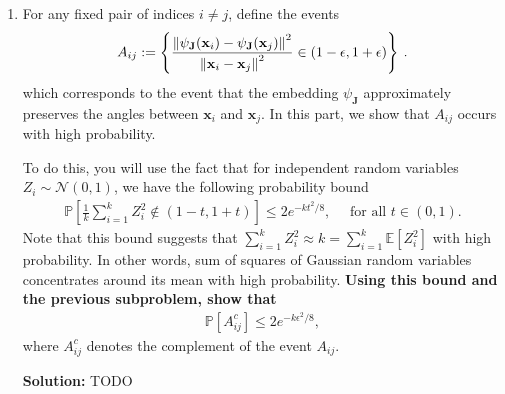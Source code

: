 \documentclass{article}
\DeclareMathOperator{\R}{\mathbb{R}}
\newcommand{\mat}[1]{\mathbf{#1}}
\renewcommand{\vec}[1]{\boldsymbol{\mathbf{#1}}}
\newenvironment{solution}{\color{blue} \smallskip \textbf{Solution:}}{}
\begin{document}
\begin{enumerate}
Consider the random matrix $ \mat J \in \R^{k \times d}$ with each of its entries being i.i.d. $\mathcal{N}(0, 1)$
and consider the map $\psi_{\mat J}: \R^\dims \mapsto \R^k$ such that $\psi_{\mat J}(\vec{x})= \frac{1}{\sqrt{k}}\mat J \vec x$.
{\bf Show that for any \emph{fixed non-zero vector $\vec u$}, 
the random variable $\displaystyle\frac{\Vert \psi_{\mat J}(\vec u)\Vert^2}{\Vert \vec u\Vert^2}$ 
can be written as 
\begin{align*}
	\frac{1}{k}\sum_{i=1}^k Z_i^2
\end{align*}
where $Z_i$'s are i.i.d. $\mathcal{N}(0, 1)$ random variables.}

\begin{solution}
    TODO
\end{solution}

\newpage
\item For any fixed pair of indices $i \ne j$, define the events
\[A_{ij} := \left\{\displaystyle\frac{\norm{\psi_{\mat J}(\vec x_i) - \psi_{\mat J}(\vec x_j)}^2}{\norm{\vec x_i - \vec x_j}^2} \in (1-\epsilon, 1+\epsilon) \right\}\:.\]
which corresponds to the event that the embedding $\psi_{\mat J}$ approximately preserves the angles between $\vec x_i$ and $\vec x_j$. In this part, we show that $A_{ij}$ occurs with high probability. 

To do this, you will use the fact that for independent random variables $Z_i \sim \mathcal{N}(0, 1)$, we
have the following probability bound
\begin{align*}
	\mathbb{P}\left[ \frac{1}{k}\sum_{i=1}^k Z_i^2 \notin (1-t, 1+t) \right] \leq 2e^{-kt^2/8}, 
	\quad \text{ for all } t \in (0, 1).
\end{align*}
Note that this bound suggests that $\sum_{i=1}^k Z_i^2 \approx k = \sum_{i=1}^k\mathbb{E}[Z_i^2]$ with high probability.
In other words, sum of squares of Gaussian random variables concentrates around its mean with high probability. {\bf Using this bound and the previous subproblem, show that }
\begin{align*}
		\mathbb{P}\left[ A_{ij}^c \right]\leq 2 e^{-k\epsilon^2/8},
	\end{align*}
	where $A_{ij}^c$ denotes the complement of the event $A_{ij}$.
 
\begin{solution}
    TODO
\end{solution}


\end{enumerate}
\end{document}
